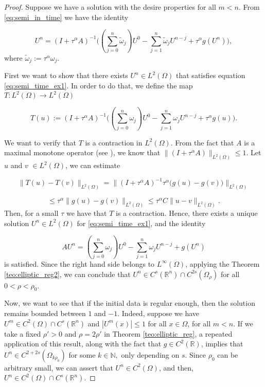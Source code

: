 \documentclass{amsart}
\newcommand{\ele}{L^2(\Omega)}
\newcommand{\w}{\omega}
\newcommand{\W}{\Omega}
\newcommand{\wtilde}{\tilde{\w}}
\newcommand{\fmonio}{g}
\def\N{{\mathbb {N}}}
\theoremstyle{remark}
\theoremstyle{definition}
\numberwithin{equation}{section}
\begin{document}
\begin{proof}

Suppose we have a solution with the desire properties for all $m<n$. From \eqref{eq:semi_in_time} we have the identity 

\begin{equation} 
      U^n  =  ( I  +  \tau^{\alpha}  A)^{-1} \Big( \left(\sum_{j=0}^{n}\wtilde_j \right)U^{0} -  \sum^n_{j=1}\wtilde_j U^{n-j} + \tau^{\alpha} \fmonio(U^n) \Big), 
\label{eq:semi_time_ex1}
\end{equation}
where $\wtilde_j := \tau^{\alpha}\w_j$. 

First we want to show that there exists $U^n \in \ele$ that satisfies equation \ref{eq:semi_time_ex1}. In order to do that, we define the map $T: L^{2}(\W) \to L^{2}(\W)$

$$T(u) :=  ( I  +  \tau^{\alpha}  A)^{-1} \Big( \left(\sum_{j=0}^{n}\w_j \right)U^{0} -  \sum^n_{j=1}\w_j U^{n-j} +  \tau^{\alpha}\fmonio(u) \Big).$$
  
We want to verify that $T$ is a contraction in $L^{2}(\W)$. From the fact that $A$ is a maximal monotone operator (see \cite{Brezis}), we know that $\|(I + \tau^{\alpha}A)\|_{\ele} \leq 1$. Let $u$ and $v$ $\in L^{2}(\W)$, we can estimate 

$$\| T(u) - T(v)  \|_{L^{2}(\W)} = \|  ( I  +  \tau^{\alpha}  A)^{-1} \tau^{\alpha} \big( \fmonio(u) - \fmonio(v) \big)  \|_{L^{2}(\W)} $$

$$ \leq \tau^{\alpha} \| \fmonio(u) - \fmonio(v) \|_{\ele} \leq \tau^{\alpha}C\| u - v \|_{\ele}. $$
Then, for a small $\tau$ we have that $T$ is a contraction. Hence, there exists a unique solution $U^n \in \ele$ for \eqref{eq:semi_time_ex1}, and the identity

\begin{equation}
\label{eq:semi_time_ex2} 
       A U^n  = \left(\sum_{j=0}^{n}\w_j \right)U^{0} -  \sum^n_{j=1}\w_j U^{n-j} +  \fmonio(U^n) 
\end{equation}
is satisfied. Since the right hand side belongs to $L^{\infty}(\W)$, applying the Theorem \ref{teo:elliptic_reg2}, we can conclude that $U^n \in C^s(\mathbb{R}^n) \cap C^{2s}(\W_{\rho})$ for all $0<\rho<\rho_0$. 

Now, we want to see that if the initial data is regular enough, then the solution remains bounded between $1$ and $-1$. Indeed, suppose we have $U^m \in  C^{2}(\W) \cap C^s(\mathbb{R}^n) $ and $|U^m(x)|\leq 1$ for all $x \in \W$, for all $m<n$. If we take a fixed $\rho'>0$ and $\rho=2\rho'$ in Theorem \ref{teo:elliptic_reg}, a repeated application of this result, along with the fact that $\fmonio \in C^2(\mathbb{R})$, implies that $U^n \in C^{2+2s}(\W_{k\rho_0})$ for some $k \in \N,$ only depending on $s$. Since $\rho_0$ can be arbitrary small, we can assert that $U^n \in  C^{2}(\W)$, and then, $U^n \in  C^{2}(\W) \cap C^s(\mathbb{R}^n)$.      



\end{proof}
\end{document}
